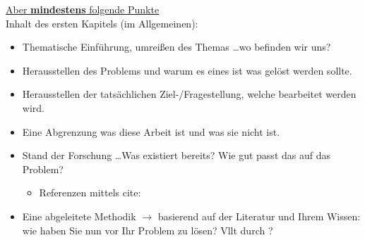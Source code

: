 \underline{Aber \textbf{mindestens} folgende Punkte}\\
Inhalt des ersten Kapitels (im Allgemeinen):
\begin{itemize}
    \item Thematische Einführung, umreißen des Themas \dots wo befinden wir uns?
    \item Herausstellen des Problems und warum es eines ist was gelöst werden sollte.
    \item Herausstellen der tatsächlichen Ziel-/Fragestellung, welche bearbeitet werden wird.
    \item Eine Abgrenzung was diese Arbeit ist und was sie nicht ist.
    \item Stand der Forschung \dots Was existiert bereits? Wie gut passt das auf das Problem?
    \begin{itemize}
        \item Referenzen mittels cite: \cite[S.~111]{jsch2011} \cite[S.~27f]{Tane2014}
    \end{itemize}
    \item Eine abgeleitete Methodik $\rightarrow$ basierend auf der Literatur und Ihrem Wissen: wie haben Sie nun vor Ihr Problem zu lösen? Vllt durch \cite{9429985}?
\end{itemize}
